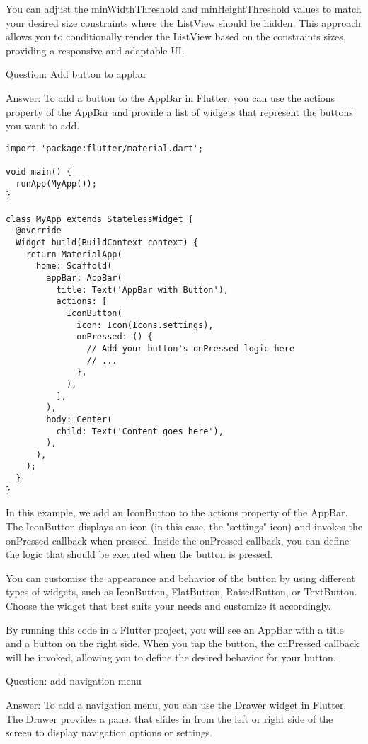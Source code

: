 You can adjust the minWidthThreshold and minHeightThreshold values to match your desired size constraints where 
the ListView should be hidden. This approach allows you to conditionally render the ListView based on the 
constraints sizes, providing a responsive and adaptable UI.

Question: Add button to appbar

Answer: To add a button to the AppBar in Flutter, you can use the actions property of the AppBar and provide a 
list of widgets that represent the buttons you want to add.

\begin{lstlisting}
import 'package:flutter/material.dart';

void main() {
  runApp(MyApp());
}

class MyApp extends StatelessWidget {
  @override
  Widget build(BuildContext context) {
    return MaterialApp(
      home: Scaffold(
        appBar: AppBar(
          title: Text('AppBar with Button'),
          actions: [
            IconButton(
              icon: Icon(Icons.settings),
              onPressed: () {
                // Add your button's onPressed logic here
                // ...
              },
            ),
          ],
        ),
        body: Center(
          child: Text('Content goes here'),
        ),
      ),
    );
  }
}
\end{lstlisting}

In this example, we add an IconButton to the actions property of the AppBar. The IconButton displays an icon (in this 
case, the "settings" icon) and invokes the onPressed callback when pressed. Inside the onPressed callback, you can 
define the logic that should be executed when the button is pressed.

You can customize the appearance and behavior of the button by using different types of widgets, such as IconButton, 
FlatButton, RaisedButton, or TextButton. Choose the widget that best suits your needs and customize it accordingly.

By running this code in a Flutter project, you will see an AppBar with a title and a button on the right side. When 
you tap the button, the onPressed callback will be invoked, allowing you to define the desired behavior for your button.


Question: add navigation menu

Answer: To add a navigation menu, you can use the Drawer widget in Flutter. The Drawer provides a panel that slides 
in from the left or right side of the screen to display navigation options or settings.

